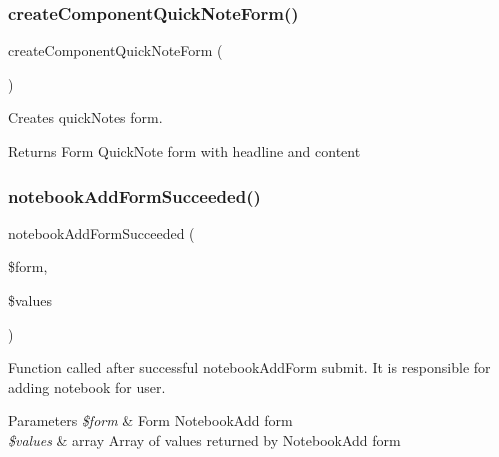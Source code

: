 \subsubsection{\texorpdfstring{create\+Component\+Quick\+Note\+Form()}{createComponentQuickNoteForm()}}
{\footnotesize\ttfamily create\+Component\+Quick\+Note\+Form (\begin{DoxyParamCaption}{ }\end{DoxyParamCaption})}

Creates quick\+Notes form.

\begin{DoxyReturn}{Returns}
Form Quick\+Note form with headline and content 
\end{DoxyReturn}
\mbox{\label{class_app_1_1_presenters_1_1_homepage_presenter_a5579f6a3db49483e429a74ba2b638b43}} 
\subsubsection{\texorpdfstring{notebook\+Add\+Form\+Succeeded()}{notebookAddFormSucceeded()}}
{\footnotesize\ttfamily notebook\+Add\+Form\+Succeeded (\begin{DoxyParamCaption}\item[{}]{\$form,  }\item[{}]{\$values }\end{DoxyParamCaption})}

Function called after successful notebook\+Add\+Form submit. It is responsible for adding notebook for user.


\begin{DoxyParams}{Parameters}
{\em \$form} & Form Notebook\+Add form \\
\hline
{\em \$values} & array Array of values returned by Notebook\+Add form \\
\hline
\end{DoxyParams}
\mbox{\label{class_app_1_1_presenters_1_1_homepage_presenter_ae4cce48b067df705c3a2c984fa74f3a9}} 
